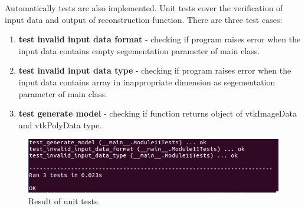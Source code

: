 \indent Automatically tests are also implemented. Unit tests cover the verification of  input data and output of reconstruction function. There are three test cases:


\begin{enumerate}
\item \textbf{test invalid input data format} - checking if program raises error when the input data contains empty segementation parameter of main class. 
\item \textbf{test invalid input data type} - checking if program raises error when the input data contains array in inappropriate dimension as segementation parameter of main class.
\item \textbf{test generate model} - checking if function returns object of vtkImageData and vtkPolyData type.
\end{enumerate}
\begin{figure}[H]
\centering{}\includegraphics[scale=0.7]{figures/Module_11/11_unit_test.png}\caption{Result of unit tests. \label{fig:figures/11_unit_test}}
\end{figure}




